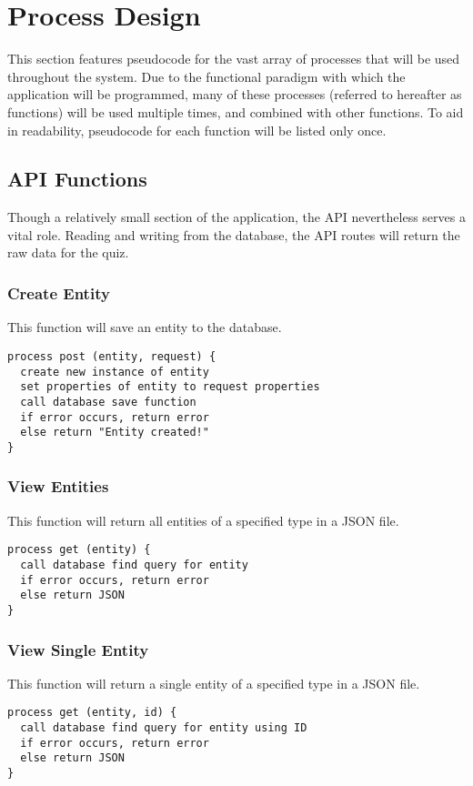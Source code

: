 \section{Process Design}
This section features pseudocode for the vast array of processes that will be used throughout the system. Due to the functional paradigm with which the application will be programmed, many of these processes (referred to hereafter as functions) will be used multiple times, and combined with other functions. To aid in readability, pseudocode for each function will be listed only once.

\subsection{API Functions}
Though a relatively small section of the application, the API nevertheless serves a vital role. Reading and writing from the database, the API routes will return the raw data for the quiz.

\subsubsection{Create Entity}
This function will save an entity to the database.
\begin{verbatim}
process post (entity, request) {
  create new instance of entity
  set properties of entity to request properties
  call database save function
  if error occurs, return error
  else return "Entity created!"
}
\end{verbatim}

\subsubsection{View Entities}
This function will return all entities of a specified type in a JSON file.
\begin{verbatim}
process get (entity) {
  call database find query for entity
  if error occurs, return error
  else return JSON
}
\end{verbatim}

\subsubsection{View Single Entity}
This function will return a single entity of a specified type in a JSON file.
\begin{verbatim}
process get (entity, id) {
  call database find query for entity using ID
  if error occurs, return error
  else return JSON
}
\end{verbatim}
